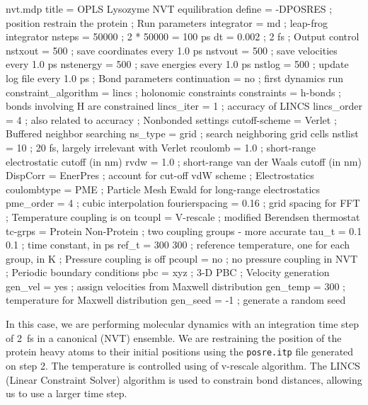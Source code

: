 \documentclass[10pt]{article}
\begin{document}
\begin{script}{nvt.mdp}
title                   = OPLS Lysozyme NVT equilibration 
define                  = -DPOSRES  ; position restrain the protein
; Run parameters
integrator              = md        ; leap-frog integrator
nsteps                  = 50000     ; 2 * 50000 = 100 ps
dt                      = 0.002     ; 2 fs
; Output control
nstxout                 = 500       ; save coordinates every 1.0 ps
nstvout                 = 500       ; save velocities every 1.0 ps
nstenergy               = 500       ; save energies every 1.0 ps
nstlog                  = 500       ; update log file every 1.0 ps
; Bond parameters
continuation            = no        ; first dynamics run
constraint_algorithm    = lincs     ; holonomic constraints 
constraints             = h-bonds   ; bonds involving H are constrained
lincs_iter              = 1         ; accuracy of LINCS
lincs_order             = 4         ; also related to accuracy
; Nonbonded settings 
cutoff-scheme           = Verlet    ; Buffered neighbor searching
ns_type                 = grid      ; search neighboring grid cells
nstlist                 = 10        ; 20 fs, largely irrelevant with Verlet
rcoulomb                = 1.0       ; short-range electrostatic cutoff (in nm)
rvdw                    = 1.0       ; short-range van der Waals cutoff (in nm)
DispCorr                = EnerPres  ; account for cut-off vdW scheme
; Electrostatics
coulombtype             = PME       ; Particle Mesh Ewald for long-range electrostatics
pme_order               = 4         ; cubic interpolation
fourierspacing          = 0.16      ; grid spacing for FFT
; Temperature coupling is on
tcoupl                  = V-rescale             ; modified Berendsen thermostat
tc-grps                 = Protein Non-Protein   ; two coupling groups - more accurate
tau_t                   = 0.1     0.1           ; time constant, in ps
ref_t                   = 300     300           ; reference temperature, one for each group, in K
; Pressure coupling is off
pcoupl                  = no        ; no pressure coupling in NVT
; Periodic boundary conditions
pbc                     = xyz       ; 3-D PBC
; Velocity generation
gen_vel                 = yes       ; assign velocities from Maxwell distribution
gen_temp                = 300       ; temperature for Maxwell distribution
gen_seed                = -1        ; generate a random seed
\end{script}

In this case, we are performing molecular dynamics with an integration time step of 2~fs in a canonical (NVT) ensemble. We are restraining the position of the protein heavy atoms to their initial positions using the \texttt{posre.itp} file generated on step 2. The temperature is controlled using of v-rescale algorithm. The LINCS (Linear Constraint Solver) algorithm is used to constrain bond distances, allowing us to use a larger time step. 
\end{document}
